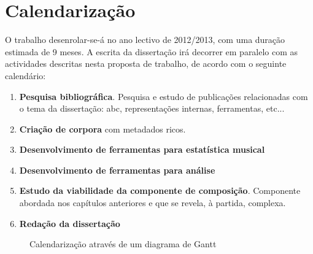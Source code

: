 \documentclass[runningheads,a4paper]{llncs}
\begin{document}
\section{Calendarização}
O trabalho desenrolar-se-á no ano lectivo de 2012/2013, com uma duração estimada de 9 meses. A
escrita da dissertação irá decorrer em paralelo com as actividades descritas nesta proposta de
trabalho, de acordo com o seguinte calendário:
\begin{enumerate}
\item \textbf{Pesquisa bibliográfica}. Pesquisa e estudo de publicações relacionadas com o tema da
dissertação: abc, representações internas, ferramentas, etc...
\item \textbf{Criação de corpora} com metadados ricos.
\item \textbf{Desenvolvimento de ferramentas para estatística musical}
\item \textbf{Desenvolvimento de ferramentas para análise}
\item \textbf{Estudo da viabilidade da componente de composição}. Componente abordada nos capítulos
anteriores e que se revela, à partida, complexa.
\item \textbf{Redação da dissertação}
\end{enumerate}

\begin{figure}[htb]
     \caption{Calendarização através de um diagrama de Gantt}
\end{figure}
\newpage

\nocite*{}

\end{document}
